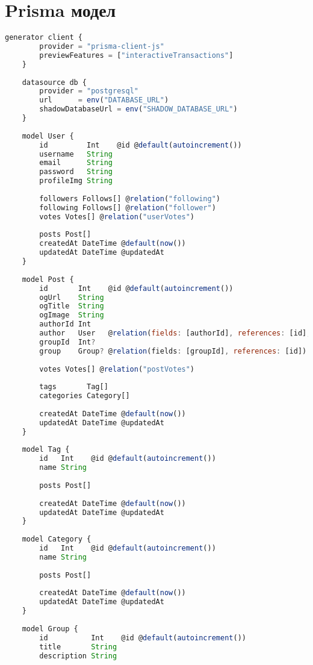 \appendix
\renewcommand\bibname{Хавсралт}

\chapter{Prisma модел}
\label{appendix:prisma-model}

\begin{lstlisting}[language=Javascript, frame=single]
	generator client {
		provider = "prisma-client-js"
		previewFeatures = ["interactiveTransactions"]
	}
	
	datasource db {
		provider = "postgresql"
		url      = env("DATABASE_URL")
		shadowDatabaseUrl = env("SHADOW_DATABASE_URL")
	}
	
	model User {
		id         Int    @id @default(autoincrement())
		username   String
		email      String
		password   String
		profileImg String
	
		followers Follows[] @relation("following")
		following Follows[] @relation("follower")
		votes Votes[] @relation("userVotes")
	
		posts Post[]
		createdAt DateTime @default(now())
		updatedAt DateTime @updatedAt
	}
	
	model Post {
		id       Int    @id @default(autoincrement())
		ogUrl    String
		ogTitle  String
		ogImage  String
		authorId Int
		author   User   @relation(fields: [authorId], references: [id], onDelete: Cascade)
		groupId  Int?
		group    Group? @relation(fields: [groupId], references: [id])
	
		votes Votes[] @relation("postVotes")
	
		tags       Tag[]
		categories Category[]
	
		createdAt DateTime @default(now())
		updatedAt DateTime @updatedAt
	}
	
	model Tag {
		id   Int    @id @default(autoincrement())
		name String
	
		posts Post[]
	
		createdAt DateTime @default(now())
		updatedAt DateTime @updatedAt
	}
	
	model Category {
		id   Int    @id @default(autoincrement())
		name String
	
		posts Post[]
	
		createdAt DateTime @default(now())
		updatedAt DateTime @updatedAt
	}
	
	model Group {
		id          Int    @id @default(autoincrement())
		title       String
		description String
	

\end{lstlisting}
